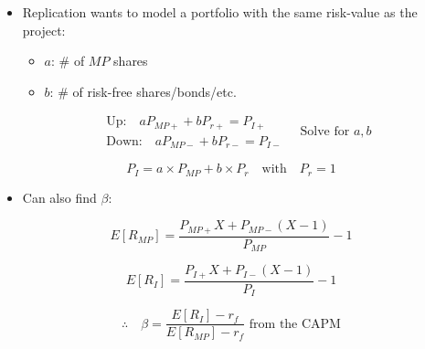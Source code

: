 \begin{definition}
\begin{tikzpicture}[->, >=stealth, auto, node distance=2.5cm, thick]
    \end{tikzpicture}

    \begin{itemize}
        \item Replication wants to model a portfolio with the same risk-value as the project:
            \begin{itemize}
                \item $a$: \# of $MP$ shares
                \item $b$: \# of risk-free shares/bonds/etc.
            \end{itemize}
    \end{itemize}
    
    \begin{equation*}
        \begin{aligned}
            &\text{Up:} \quad a P_{MP+} + b P_{r+} = P_{I+} \\
            &\text{Down:} \quad a P_{MP-} + b P_{r-} = P_{I-}
        \end{aligned}
        \quad \text{Solve for } a, b
    \end{equation*}
    
    \[
    P_I = a \times P_{MP} + b \times P_r \quad \text{with} \quad P_r = 1
    \]
    
    \begin{itemize}
        \item Can also find $\beta$:
    \end{itemize}
    
    \[
    E[R_{MP}] = \frac{P_{MP+} X + P_{MP-} (X-1)}{P_{MP}} - 1 
    \]
    
    \[
    E[R_I] = \frac{P_{I+} X + P_{I-} (X-1)}{P_I} - 1
    \]
    
    \[
    \therefore \quad \beta = \frac{E[R_I] - r_f}{E[R_{MP}] - r_f} \text{ from the CAPM}
    \]

\end{definition}

